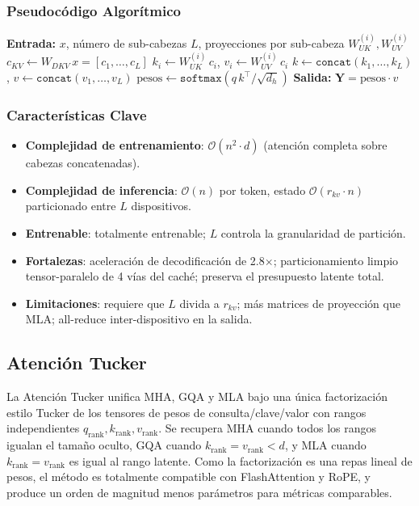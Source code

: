 \subsubsection{Pseudocódigo Algorítmico}
\begin{algorithmic}[1]
\State \textbf{Entrada:} $x$, número de sub-cabezas $L$, proyecciones por sub-cabeza $W_{UK}^{(i)}, W_{UV}^{(i)}$
\State $c_{KV} \gets W_{DKV}\, x = [c_1, \ldots, c_L]$ 
    \State $k_i \gets W_{UK}^{(i)}\, c_i$, \quad $v_i \gets W_{UV}^{(i)}\, c_i$
\EndFor
\State $k \gets \texttt{concat}(k_1, \ldots, k_L)$, \quad $v \gets \texttt{concat}(v_1, \ldots, v_L)$
\State $\text{pesos} \gets \texttt{softmax}(q\, k^\top / \sqrt{d_h})$
\State \textbf{Salida:} $\mathbf{Y} = \text{pesos} \cdot v$
\end{algorithmic}

\subsubsection{Características Clave}
\begin{itemize}[leftmargin=*]
    \item \textbf{Complejidad de entrenamiento}: $\mathcal{O}(n^2 \cdot d)$ (atención completa sobre cabezas concatenadas).
    \item \textbf{Complejidad de inferencia}: $\mathcal{O}(n)$ por token, estado $\mathcal{O}(r_{kv} \cdot n)$ particionado entre $L$ dispositivos.
    \item \textbf{Entrenable}: totalmente entrenable; $L$ controla la granularidad de partición.
    \item \textbf{Fortalezas}: aceleración de decodificación de 2.8$\times$; particionamiento limpio tensor-paralelo de 4 vías del caché; preserva el presupuesto latente total.
    \item \textbf{Limitaciones}: requiere que $L$ divida a $r_{kv}$; más matrices de proyección que MLA; all-reduce inter-dispositivo en la salida.
\end{itemize}

\subsection{Atención Tucker}
La Atención Tucker \citep{klein_tucker_2026} unifica MHA, GQA y MLA bajo una única factorización estilo Tucker de los tensores de pesos de consulta/clave/valor con rangos independientes $q_{\text{rank}}, k_{\text{rank}}, v_{\text{rank}}$. Se recupera MHA cuando todos los rangos igualan el tamaño oculto, GQA cuando $k_{\text{rank}} = v_{\text{rank}} < d$, y MLA cuando $k_{\text{rank}} = v_{\text{rank}}$ es igual al rango latente. Como la factorización es una repas lineal de pesos, el método es totalmente compatible con FlashAttention y RoPE, y produce un orden de magnitud menos parámetros para métricas comparables.

